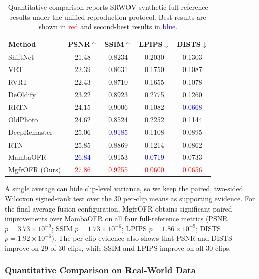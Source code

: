 \documentclass[symmetry,article,submit,pdftex,moreauthors]{Definitions/mdpi}
\DeclareRobustCommand{\bestres}[1]{\textcolor{red}{#1}}
\DeclareRobustCommand{\secondres}[1]{\textcolor{blue}{#1}}
\begin{document}
\begin{table}[htbp]
\caption{Quantitative comparison reports SRWOV synthetic full-reference results under the unified reproduction protocol. Best results are shown in \bestres{red} and second-best results in \secondres{blue}.\label{tab:sota}}
\begin{tabularx}{\textwidth}{lCCCC}
\toprule
\textbf{Method} & \textbf{PSNR$\uparrow$} & \textbf{SSIM$\uparrow$} & \textbf{LPIPS$\downarrow$} & \textbf{DISTS$\downarrow$} \\
\midrule
ShiftNet~\cite{li2023shiftnet}          & 21.48 & 0.8234 & 0.2030 & 0.1303 \\
VRT~\cite{liang2024vrt}                 & 22.39 & 0.8631 & 0.1750 & 0.1087 \\
RVRT~\cite{liang2022rvrt}              & 22.43 & 0.8710 & 0.1655 & 0.1078 \\
DeOldify~\cite{jantic2019deoldify}      & 23.22 & 0.8923 & 0.2775 & 0.1260 \\
RRTN~\cite{lin2024rrtn}                & 24.15 & 0.9006 & 0.1082 & \secondres{0.0668} \\
OldPhoto~\cite{wan2023oldphotopami}     & 24.62 & 0.8524 & 0.2252 & 0.1144 \\
DeepRemaster~\cite{iizuka2019deepremaster} & 25.06 & \secondres{0.9185} & 0.1108 & 0.0895 \\
RTN~\cite{wan2022rtn}                   & 25.85 & 0.8869 & 0.1214 & 0.0862 \\
MambaOFR~\cite{mao2025mambaofr}        & \secondres{26.84} & 0.9153 & \secondres{0.0719} & 0.0733 \\
\midrule
MgfrOFR (Ours)                          & \bestres{27.86} & \bestres{0.9255} & \bestres{0.0600} & \bestres{0.0656} \\
\bottomrule
\end{tabularx}
\end{table}

A single average can hide clip-level variance, so we keep the paired, two-sided Wilcoxon signed-rank test over the 30 per-clip means as supporting evidence. For the final average-fusion configuration, MgfrOFR obtains significant paired improvements over MambaOFR on all four full-reference metrics (PSNR $p=3.73\times10^{-9}$; SSIM $p=1.73\times10^{-6}$; LPIPS $p=1.86\times10^{-9}$; DISTS $p=1.92\times10^{-6}$). The per-clip evidence also shows that PSNR and DISTS improve on 29 of 30 clips, while SSIM and LPIPS improve on all 30 clips.

\subsubsection{Quantitative Comparison on Real-World Data}
\end{document}
